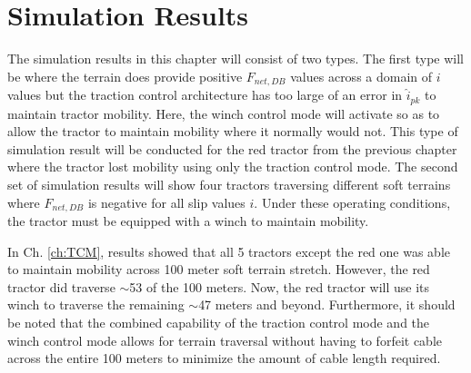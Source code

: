 \section{Simulation Results}
The simulation results in this chapter will consist of two types. The first type will be where the terrain does provide positive $F_{net,DB}$ values across a domain of $i$ values but the traction control architecture has too large of an error in $\hat{i}_{pk}$ to maintain tractor mobility. Here, the winch control mode will activate so as to allow the tractor to maintain mobility where it normally would not. This type of simulation result will be conducted for the red tractor from the previous chapter where the tractor lost mobility using only the traction control mode. The second set of simulation results will show four tractors traversing different soft terrains where $F_{net,DB}$ is negative for all slip values $i$. Under these operating conditions, the tractor must be equipped with a winch to maintain mobility. 

In Ch. \ref{ch:TCM}, results showed that all 5 tractors except the red one was able to maintain mobility across 100 meter soft terrain stretch. However, the red tractor did traverse $\sim$53 of the 100 meters. Now, the red tractor will use its winch to traverse the remaining $\sim$47 meters and beyond. Furthermore, it should be noted that the combined capability of the traction control mode and the winch control mode allows for terrain traversal without having to forfeit cable across the entire 100 meters to minimize the amount of cable length required.

